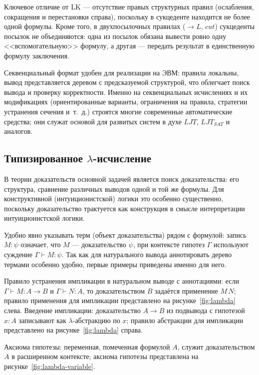 \documentclass[14pt, russian]{scrartcl}
\begin{document}
Ключевое отличие от LK --- отсутствие правых структурных правил (ослабления,
сокращения и перестановки справа), поскольку в сукцеденте находится не более
одной формулы. Кроме того, в двухпосылочных правилах ($\rightarrow L$, $cut$)
сукцеденты посылок не объединяются: одна из посылок обязана вывести ровно одну
<<вспомогательную>> формулу, а другая --- передать результат в единственную
формулу заключения.

Секвенциальный формат удобен для реализации на ЭВМ: правила локальны, вывод
представляется деревом с предсказуемой структурой, что облегчает поиск вывода и
проверку корректности. Именно на секвенциальных исчислениях и их модификациях
(ориентированные варианты, ограничения на правила, стратегии устранения сечения
и~т.~д.) строятся многие современные автоматические средства; они служат основой
для развитых систем в духе $LJT$, $LJT_{SAT}$ и аналогов.

\subsection{Типизированное \texorpdfstring{$\lambda$-исчисление}{лямбда-исчисление}}

В теории доказательств основной задачей является поиск доказательства: его
структура, сравнение различных выводов одной и той же формулы. Для
конструктивной (интуиционистской) логики это особенно существенно, поскольку
доказательство трактуется как конструкция в смысле интерпретации
интуиционистской логики.

Удобно явно указывать терм (объект доказательства) рядом с формулой: запись
$M : \psi$ означает, что $M$ --- доказательство $\psi$, при контексте гипотез
$\Gamma$ используют суждение $\Gamma \vdash M : \psi$. Так как для натурального вывода
аннотировать дерево термами особенно удобно, первые примеры приведены именно для него.

Правило устранения импликации в натуральном выводе с аннотациями: если
$\Gamma \vdash M : A \rightarrow B$ и $\Gamma \vdash N : A$, то доказательством $B$ задаётся применение $M\,N$; правило применения для импликации представлено на рисунке~\ref{fig:lambda} слева. Введение импликации: доказательство $A \rightarrow B$ из подвывода с гипотезой
$x : A$ записывают как $\lambda$-абстракцию по $x$; правило абстракции для импликации представлено на рисунке~\ref{fig:lambda} справа.

Аксиома гипотезы: переменная, помеченная формулой $A$, служит доказательством
$A$ в расширенном контексте; аксиома гипотезы представлена на рисунке~\ref{fig:lambda-variable}.
\end{document}
